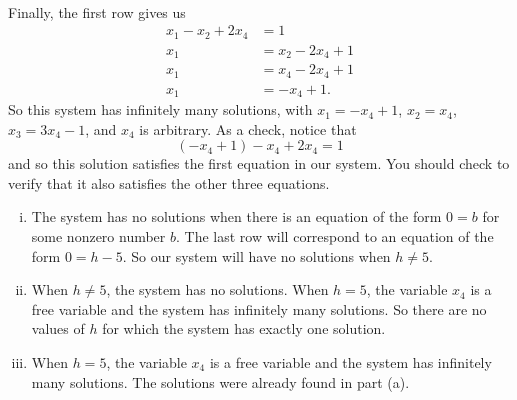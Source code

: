 \begin{example}
\begin{align*}
 \end{align*}
 Finally, the first row gives us
 \begin{align*}
 x_1-x_2+2x_4 &= 1 \\
 x_1 &= x_2 - 2x_4 + 1 \\
 x_1 &= x_4 - 2x_4 + 1 \\
 x_1 &= -x_4 + 1.
 \end{align*}
 So this system has infinitely many solutions, with $x_1 = -x_4 + 1$, $x_2 = x_4$, $x_3 = 3x_4 - 1$, and $x_4$ is arbitrary. As a check, notice that 
 \[(-x_4+1) - x_4 + 2x_4 = 1\]
 and so this solution satisfies the first equation in our system. You should check to verify that it also satisfies the other three equations.
 \item 
 	\begin{enumerate}[i.]
	\item The system has no solutions when there is an equation of the form $0 = b$ for some nonzero number $b$. The last row will correspond to an equation of the form $0 = h-5$. So our system will have no solutions when $h \neq 5$. 
	\item When $h \neq 5$, the system has no solutions. When $h = 5$, the variable $x_4$ is a free variable and the system has infinitely many solutions. So there are no values of $h$ for which the system has exactly one solution.
	\item When $h = 5$, the variable $x_4$ is a free variable and the system has infinitely many solutions. The solutions were already found in part (a).
	\end{enumerate}
 
 \ea 
	 
\end{example}

